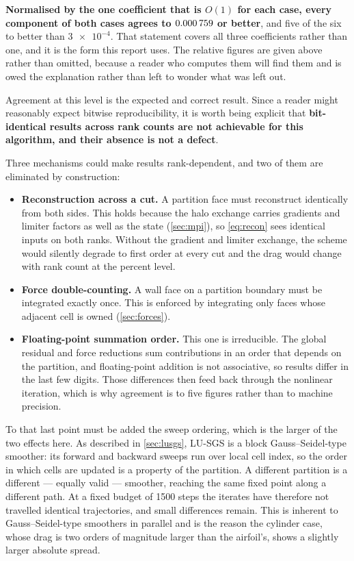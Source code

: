 \textbf{Normalised by the one coefficient that is $O(1)$ for each case, every component of
both cases agrees to $\num{0.000759}$ or better}, and five of the six to better
than $\num{3e-4}$. That statement covers all three coefficients rather than one, and it is
the form this report uses. The relative figures are given above rather than omitted, because
a reader who computes them will find them and is owed the explanation rather than left to
wonder what was left out.

Agreement at this level is the expected and correct result. Since a reader might
reasonably expect bitwise reproducibility, it is worth being explicit that
\textbf{bit-identical results across rank counts are not achievable for this
algorithm, and their absence is not a defect}.

Three mechanisms could make results rank-dependent, and two of them are
eliminated by construction:

\begin{itemize}
  \item \textbf{Reconstruction across a cut.} A partition face must reconstruct
  identically from both sides. This holds because the halo exchange carries
  gradients and limiter factors as well as the state (\cref{sec:mpi}), so
  \cref{eq:recon} sees identical inputs on both ranks. Without the gradient and
  limiter exchange, the scheme would silently degrade to first order at every cut
  and the drag would change with rank count at the percent level.
  \item \textbf{Force double-counting.} A wall face on a partition boundary must
  be integrated exactly once. This is enforced by integrating only faces whose
  adjacent cell is owned (\cref{sec:forces}).
  \item \textbf{Floating-point summation order.} This one is irreducible. The
  global residual and force reductions sum contributions in an order that depends
  on the partition, and floating-point addition is not associative, so results
  differ in the last few digits. Those differences then feed back through the
  nonlinear iteration, which is why agreement is to five figures rather than to
  machine precision.
\end{itemize}

To that last point must be added the sweep ordering, which is the larger of the
two effects here. As described in \cref{sec:lusgs}, LU-SGS is a block
Gauss--Seidel-type smoother: its forward and backward sweeps run over local cell
index, so the order in which cells are updated is a property of the partition. A
different partition is a different --- equally valid --- smoother, reaching the same
fixed point along a different path. At a fixed budget of 1500 steps the iterates
have therefore not travelled identical trajectories, and small differences remain.
This is inherent to Gauss--Seidel-type smoothers in parallel and is the reason the
cylinder case, whose drag is two orders of magnitude larger than the airfoil's,
shows a slightly larger absolute spread.

